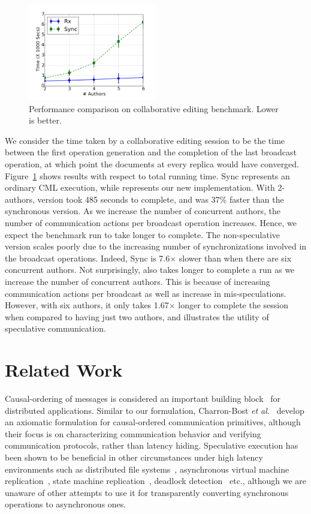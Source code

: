 \begin{figure}[h]
\centering
\includegraphics[width=0.5\textwidth]{Graphs/collab}
\caption{Performance comparison on collaborative editing benchmark. Lower is
better.}
\label{grf:collab}
\end{figure}

We consider the time taken by a collaborative editing session to be the time
between the first operation generation and the completion of the last broadcast
operation, at which point the documents at every replica would have converged.
Figure~\ref{grf:collab} shows results with respect to total running time. Sync
represents an ordinary CML execution, while \rxcml represents our new
implementation. With 2-authors, \rxcml version took 485 seconds to complete,
and was 37\% faster than the synchronous version. As we increase the number of
concurrent authors, the number of communication actions per broadcast operation
increases.  Hence, we expect the benchmark run to take longer to complete. The
non-speculative version scales poorly due to the increasing number of
synchronizations involved in the broadcast operations. Indeed, Sync is
7.6$\times$ slower than \rxcml when there are six concurrent authors. Not
surprisingly, \rxcml also takes longer to complete a run as we increase the
number of concurrent authors. This is because of increasing communication
actions per broadcast as well as increase in mis-speculations. However, with
six authors, it only takes 1.67$\times$ longer to complete the session when
compared to having just two authors, and illustrates the utility of speculative
communication.

\section{Related Work}

Causal-ordering of messages is considered an important building
block~\cite{Birman87} for distributed applications. Similar to our formulation,
Charron-Bost \emph{et al.}~\cite{Charron-Bost96} develop an axiomatic
formulation for causal-ordered communication primitives, although their focus
is on characterizing communication behavior and verifying communication
protocols, rather than latency hiding. Speculative execution has been shown to
be beneficial in other circumstances under high latency environments such as
distributed file systems~\cite{Nightingale05}, asynchronous virtual machine
replication~\cite{Cully08}, state machine replication~\cite{Wester09}, deadlock
detection~\cite{Li05} etc., although we are unaware of other attempts to use it
for transparently converting synchronous operations to asynchronous ones.

